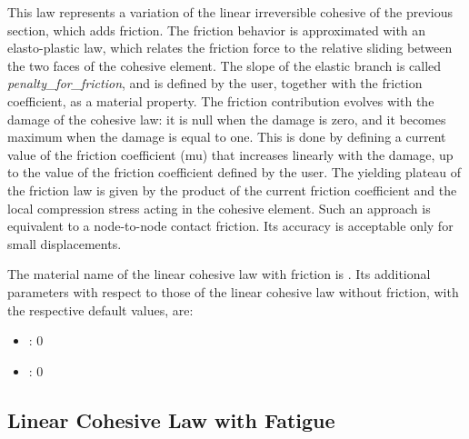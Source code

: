 This law represents a variation of the linear irreversible cohesive of
the previous section, which adds friction.  The friction behavior is
approximated with an elasto-plastic law, which relates the friction
force to the relative sliding between the two faces of the cohesive
element.  The slope of the elastic branch is called
\emph{penalty\_for\_friction}, and is defined by the user, together
with the friction coefficient, as a material property.  The friction
contribution evolves with the damage of the cohesive law: it is null
when the damage is zero, and it becomes maximum when the damage is
equal to one.  This is done by defining a current value of the
friction coefficient (mu) that increases linearly with the damage, up
to the value of the friction coefficient defined by the user.  The
yielding plateau of the friction law is given by the product of the
current friction coefficient and the local compression stress acting
in the cohesive element.  Such an approach is equivalent to a
node-to-node contact friction. Its accuracy is acceptable only for
small displacements.

The material name of the linear cohesive law with friction is
. Its additional parameters
with respect to those of the linear cohesive law without friction,
with the respective default values, are:
\begin{itemize}
\item {}: 0
\item {}: 0
\end{itemize}


\subsection{Linear Cohesive Law with Fatigue}

